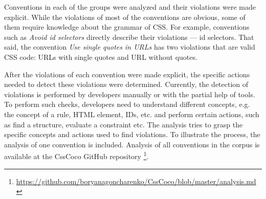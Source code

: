 Conventions in each of the groups were analyzed and their violations were made
explicit. While the violations of most of the conventions are obvious, some of
them require knowledge about the grammar of CSS. For example, conventions such
as \textit{Avoid id selectors} directly describe their violations --- id
selectors. That said, the convention \textit{Use single quotes in URLs} has
two violations that are valid CSS code: URLs with single quotes and URL
without quotes.

After the violations of each convention were made explicit, the specific actions needed to detect
these violations were determined. Currently, the detection of violations is performed by developers
manually or with the partial help of tools. To perform such checks, developers need to understand
different concepts, e.g. the concept of a rule, HTML element, IDs, etc. and perform certain actions,
such as find a structure, evaluate a constraint etc. The analysis tries to grasp the specific
concepts and actions used to find violations. To illustrate the process, the analysis of one convention is included. Analysis of all conventions in the corpus is available at the CssCoco GitHub repository
\footnote{\url{https://github.com/boryanagoncharenko/CssCoco/blob/master/analysis.md}}.

